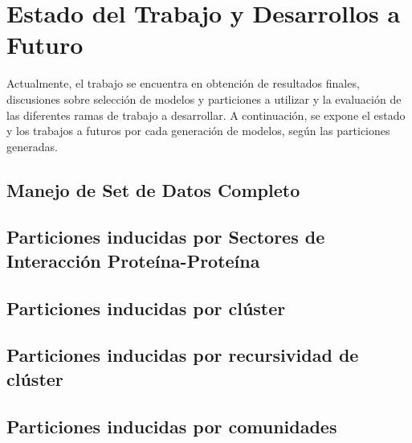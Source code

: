 \chapter{Estado del Trabajo y Desarrollos a Futuro}

Actualmente, el trabajo se encuentra en obtenci\'on de resultados finales, discusiones sobre selecci\'on de modelos y particiones a utilizar y la evaluaci\'on de las diferentes ramas de trabajo a desarrollar. A continuaci\'on, se expone el estado y los trabajos a futuros por cada generaci\'on de modelos, seg\'un las particiones generadas.

\section{Manejo de Set de Datos Completo}

\section{Particiones inducidas por Sectores de Interacci\'on Prote\'ina-Prote\'ina}

\section{Particiones inducidas por cl\'uster}

\section{Particiones inducidas por recursividad de cl\'uster}

\section{Particiones inducidas por comunidades}
